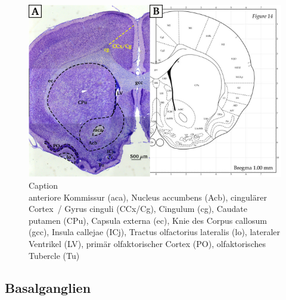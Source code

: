 \documentclass[12pt,a4paper,pdftex]{article}
\begin{document}
\begin{figure}
    \centering
    \includegraphics{pictures/Basalganglia/cingulaerer_Cortex.png}
    \caption{Caption\\
    anteriore Kommissur (aca), Nucleus accumbens (Acb), cingulärer Cortex~/ Gyrus cinguli (CCx/Cg), Cingulum (cg), Caudate putamen (CPu), Capsula externa (ec), Knie des Corpus callosum (gcc), Insula callejae (ICj), Tractus olfactorius lateralis (lo), lateraler Ventrikel (LV), primär olfaktorischer Cortex (PO), olfaktorisches Tubercle (Tu)}
    \label{fig:cingulaerer_Cortex}
\end{figure}


\subsection{Basalganglien} \label{subsec:basalganglien}
\end{document}
